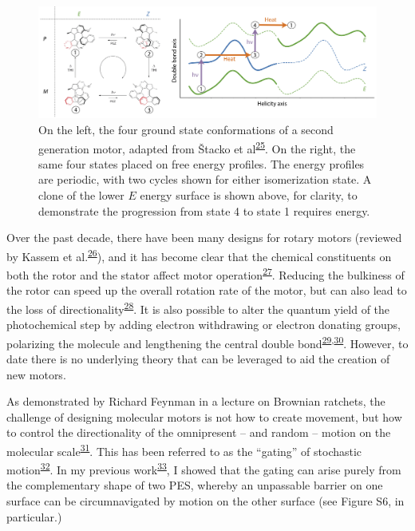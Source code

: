 \documentclass[11pt,notitlepage]{article}
\begin{document}
\begin{figure}
\centering
\includegraphics[width=1\textwidth,height=\textheight]{content/images/offset-barriers.png}
\caption{On the left, the four ground state conformations of a second
generation motor, adapted from Štacko et
al\textsuperscript{\protect\hyperlink{ref-mKSNFvW7}{25}}. On the right,
the same four states placed on free energy profiles. The energy profiles
are periodic, with two cycles shown for either isomerization state. A
clone of the lower \(E\) energy surface is shown above, for clarity, to
demonstrate the progression from state 4 to state 1 requires
energy.\label{fig:motors}}
\end{figure}

Over the past decade, there have been many designs for rotary motors
(reviewed by Kassem et
al.\textsuperscript{\protect\hyperlink{ref-1H5r7SBir}{26}}), and it has
become clear that the chemical constituents on both the rotor and the
stator affect motor
operation\textsuperscript{\protect\hyperlink{ref-MVPWALSk}{27}}.
Reducing the bulkiness of the rotor can speed up the overall rotation
rate of the motor, but can also lead to the loss of
directionality\textsuperscript{\protect\hyperlink{ref-1F5wsgY82}{28}}.
It is also possible to alter the quantum yield of the photochemical step
by adding electron withdrawing or electron donating groups, polarizing
the molecule and lengthening the central double
bond\textsuperscript{\protect\hyperlink{ref-Ewc7FKL8}{29},\protect\hyperlink{ref-122TltEto}{30}}.
However, to date there is no underlying theory that can be leveraged to
aid the creation of new motors.

As demonstrated by Richard Feynman in a lecture on Brownian ratchets,
the challenge of designing molecular motors is not how to create
movement, but how to control the directionality of the omnipresent --
and random -- motion on the molecular
scale\textsuperscript{\protect\hyperlink{ref-10FsKpWBI}{31}}. This has
been referred to as the ``gating'' of stochastic
motion\textsuperscript{\protect\hyperlink{ref-qhUBHBOM}{32}}. In my
previous work\textsuperscript{\protect\hyperlink{ref-1BfYw0gk2}{33}}, I
showed that the gating can arise purely from the complementary shape of
two PES, whereby an unpassable barrier on one surface can be
circumnavigated by motion on the other surface (see Figure S6, in
particular.)
\end{document}
